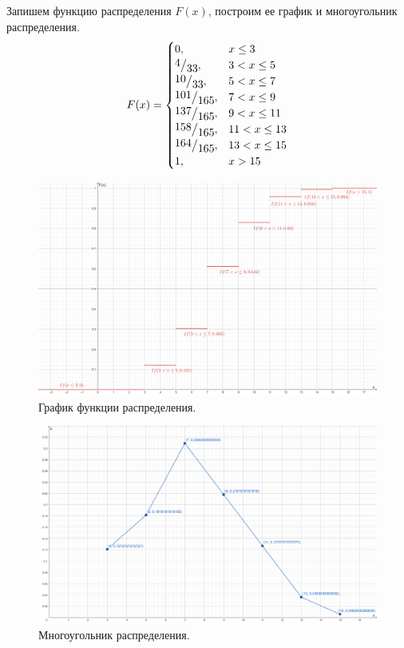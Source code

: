 \documentclass[a4paper, 12pt]{article}
\newcommand{\frc}[2]{\raisebox{2pt}{$#1$}\big/\raisebox{-3pt}{$#2$}}
\begin{document}
    Запишем функцию распределения $F(x)$, построим ее график и многоугольник распределения.
    $$F(x)=
    \begin{cases}
        0, & x\leq 3\\
        \frc{4}{33}, & 3 < x \leq 5\\
        \frc{10}{33}, & 5 < x \leq 7\\
        \frc{101}{165}, & 7 < x \leq 9\\
        \frc{137}{165}, & 9 < x \leq 11\\
        \frc{158}{165}, & 11 < x \leq 13\\
        \frc{164}{165}, & 13 < x \leq 15\\
        1, & x > 15
    \end{cases}
    $$
    \begin{figure}[H]
        \centering
        \includegraphics[scale=0.5]{F_x.png}
        \captionsetup{skip=0pt}
        \caption{График функции распределения.}
        \label{fig:F_x}
    \end{figure}
    \begin{figure}[H]
        \centering
        \includegraphics[scale=0.65]{polydis.png}
        \captionsetup{skip=0pt}
        \caption{Многоугольник распределения.}
        \label{fig:polydis}
    \end{figure}
\end{document}
